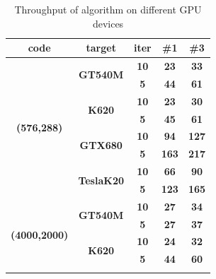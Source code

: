 \documentclass[conference]{IEEEtran}
\begin{document}
\begin{table}[]
\centering
\caption{Throughput of algorithm on different GPU devices}\label{table:gpus}
\begin{tabular}{@{}cc|c|cc@{}}
\toprule
\textbf{code}                        & \textbf{target}                    & \textbf{iter} & \textbf{\#1} & \textbf{\#3}  \\ \midrule
\multirow{8}{*}{\textbf{(576,288)}}  & \multirow{2}{*}{\textbf{GT540M}}   & \textbf{10}   & \textbf{23}  & \textbf{33}   \\ \cmidrule(l){3-5} 
                                     &                                    & \textbf{5}    & \textbf{44}  & \textbf{61}   \\ \cmidrule(l){2-5} 
                                     & \multirow{2}{*}{\textbf{K620}}     & \textbf{10}   & \textbf{23}  & \textbf{30}   \\ \cmidrule(l){3-5} 
                                     &                                    & \textbf{5}    & \textbf{45}  & \textbf{61}   \\ \cmidrule(l){2-5} 
                                     & \multirow{2}{*}{\textbf{GTX680}}   & \textbf{10}   & \textbf{94}  & \textbf{127}  \\ \cmidrule(l){3-5} 
                                     &                                    & \textbf{5}    & \textbf{163} & \textbf{217}  \\ \cmidrule(l){2-5} 
                                     & \multirow{2}{*}{\textbf{TeslaK20}} & \textbf{10}   & \textbf{66}  & \textbf{90}   \\ \cmidrule(l){3-5} 
                                     &                                    & \textbf{5}    & \textbf{123} & \textbf{165}  \\ \midrule
\multirow{8}{*}{\textbf{(4000,2000)}}& \multirow{2}{*}{\textbf{GT540M}}   & \textbf{10}   & \textbf{27}  & \textbf{34}   \\ \cmidrule(l){3-5} 
                                     &                                    & \textbf{5}    & \textbf{27}  & \textbf{37}   \\ \cmidrule(l){2-5} 
                                     & \multirow{2}{*}{\textbf{K620}}     & \textbf{10}   & \textbf{24}  & \textbf{32}   \\ \cmidrule(l){3-5}
                                     &                                    & \textbf{5}    & \textbf{44}   & \textbf{60}   \\ \cmidrule(l){2-5}

\end{tabular}
\end{table}
\end{document}
